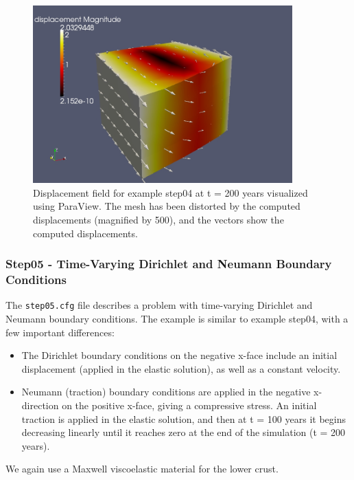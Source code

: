 \begin{figure}
\begin{centering}
\includegraphics[width=10cm]{tutorials/3dhex8/figs/step04-displ-t200}
\par\end{centering}

\caption{Displacement field for example step04 at t = 200 years visualized
using ParaView. The mesh has been distorted by the computed displacements
(magnified by 500), and the vectors show the computed displacements.\label{fig:step04-displ-t200}}
\end{figure}



\subsubsection{Step05 - Time-Varying Dirichlet and Neumann Boundary Conditions}

The \texttt{step05.cfg} file describes a problem with time-varying
Dirichlet and Neumann boundary conditions. The example is similar
to example step04, with a few important differences:
\begin{itemize}
\item The Dirichlet boundary conditions on the negative x-face include an
initial displacement (applied in the elastic solution), as well as
a constant velocity.
\item Neumann (traction) boundary conditions are applied in the negative
x-direction on the positive x-face, giving a compressive stress. An
initial traction is applied in the elastic solution, and then at t
= 100 years it begins decreasing linearly until it reaches zero at
the end of the simulation (t = 200 years).
\end{itemize}
We again use a Maxwell viscoelastic material for the lower crust.

